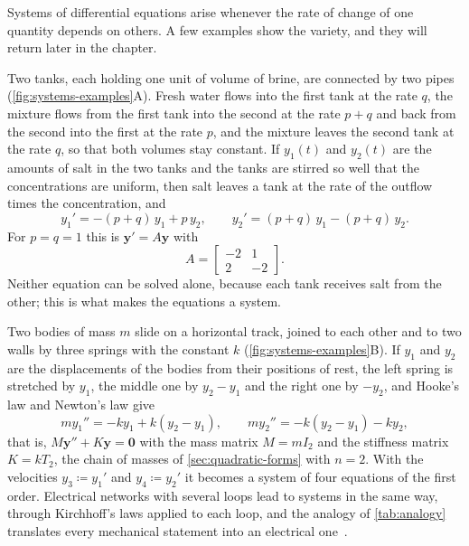 Systems of differential equations arise whenever the rate of change of one quantity depends on others. A few examples show the variety, and they will return later in the chapter.

Two tanks, each holding one unit of volume of brine, are connected by two pipes (\cref{fig:systems-examples}A). Fresh water flows into the first tank at the rate $q$, the mixture flows from the first tank into the second at the rate $p+q$ and back from the second into the first at the rate $p$, and the mixture leaves the second tank at the rate $q$, so that both volumes stay constant. If $y_1(t)$ and $y_2(t)$ are the amounts of salt in the two tanks and the tanks are stirred so well that the concentrations are uniform, then salt leaves a tank at the rate of the outflow times the concentration, and
\[
y_1'=-(p+q)\,y_1+p\,y_2,\qquad y_2'=(p+q)\,y_1-(p+q)\,y_2 .
\]
For $p=q=1$ this is $\mathbf y'=A\mathbf y$ with
\begin{equation}
A=\begin{bmatrix}-2&1\\2&-2\end{bmatrix}.
\label{eq:tank-matrix}
\end{equation}
Neither equation can be solved alone, because each tank receives salt from the other; this is what makes the equations a system.

Two bodies of mass $m$ slide on a horizontal track, joined to each other and to two walls by three springs with the constant $k$ (\cref{fig:systems-examples}B). If $y_1$ and $y_2$ are the displacements of the bodies from their positions of rest, the left spring is stretched by $y_1$, the middle one by $y_2-y_1$ and the right one by $-y_2$, and Hooke's law and Newton's law give
\[
my_1''=-ky_1+k(y_2-y_1),\qquad my_2''=-k(y_2-y_1)-ky_2 ,
\]
that is, $M\mathbf y''+K\mathbf y=\mathbf 0$ with the mass matrix $M=mI_2$ and the stiffness matrix $K=kT_2$, the chain of masses of \cref{sec:quadratic-forms} with $n=2$. With the velocities $y_3\coloneqq y_1'$ and $y_4\coloneqq y_2'$ it becomes a system of four equations of the first order. Electrical networks with several loops lead to systems in the same way, through Kirchhoff's laws applied to each loop, and the analogy of \cref{tab:analogy} translates every mechanical statement into an electrical one~\cite[Chap.~7]{boyce2017}.

